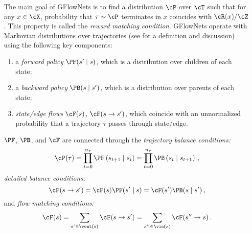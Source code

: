 The main goal of GFlowNets is to find a distribution $\cP$ over $\cT$ such that for any $x \in \cX$, probability that $\tau \sim \cP$ terminates in $x$ coincides with $\cR(x) / \cZ$. This property is called the \textit{reward matching condition}. GFlowNets operate with Markovian distributions over trajectories (see \cite{bengio2023gflownet} for a definition and discussion) using the following key components: 
\begin{enumerate}%
\item a \textit{forward policy} $\PF(s' \mid s)$, which is a distribution over children of each state;
\item a \textit{backward policy} $\PB(s \mid s')$, which is a distribution over parents of each state;
\item \textit{state/edge flows} $\cF(s)$, $\cF(s \to s')$, which coincide with an unnormalized probability that a trajectory $\tau$ passes through state/edge.
\end{enumerate}
$\PF$, $\PB$, and $\cF$ are connected through the \textit{trajectory balance conditions:}
\begin{equation}
\label{eq:tb}
     \cP(\tau) = \prod_{t=0}^{n_\tau} \PF \left(s_{t+1} \mid s_{t}\right) = \prod_{t=0}^{n_\tau} \PB \left(s_{t} \mid s_{t+1}\right)\,,%
\end{equation}%
\textit{detailed balance conditions:}
\begin{equation}
\label{eq:db}
     \cF(s \to s') = \cF(s)\PF(s' \mid s) = \cF(s')\PB(s \mid s')\,,%
\end{equation}%
and \textit{flow matching conditions:}
\begin{equation}
\label{eq:fm}
     \cF(s) = \sum_{s' \in \vout(s)} \cF(s \to s') = \sum_{s'' \in \vin(s)} \cF(s'' \to s)\,.%
\end{equation}%

